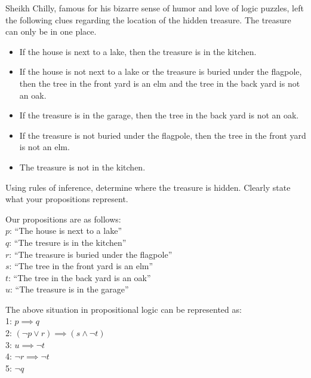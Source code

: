 \documentclass[addpoints]{exam}
\newenvironment{problem}[2][Problem]{\begin{trivlist}
    \item[\hskip \labelsep {\bfseries #1}\hskip \labelsep {\bfseries #2.}]}{\end{trivlist}}
\begin{document}
\begin{sloppypar}
\begin{problem}{6}
Sheikh Chilly, famous for his bizarre sense of humor and love of logic puzzles, left the following clues
regarding the location of the hidden treasure. The treasure can only be in one place.
\begin{itemize}
    \item If the house is next to a lake, then the treasure is in the kitchen.
    \item If the house is not next to a lake or the treasure is buried under the flagpole, then the tree in the front yard is an elm and the tree in the back yard is not an oak.
    \item If the treasure is in the garage, then the tree in the back yard is not an oak.
    \item If the treasure is not buried under the flagpole, then the tree in the front yard is not an elm.
    \item The treasure is not in the kitchen.
\end{itemize}
Using rules of inference, determine where the treasure is hidden. Clearly state what your propositions
represent.
\end{problem}

\begin{questions}
    \question
    \begin{solution}
        Our propositions are as follows: \\ 
        $p$: ``The house is next to a lake'' \\ 
        $q$: ``The tresure is in the kitchen'' \\ 
        $r$: ``The treasure is buried under the flagpole'' \\ 
        $s$: ``The tree in the front yard is an elm'' \\ 
        $t$: ``The tree in the back yard is an oak'' \\ 
        $u$: ``The treasure is in the garage'' 

        The above situation in propositional logic can be represented as: \\ 
        1: $ p \implies q $ \\ 
        2: $ (\neg p \lor r) \implies (s \land \neg t) $ \\ 
        3: $ u \implies \neg t $ \\ 
        4: $ \neg r \implies \neg t $ \\ 
        5: $ \neg q $
        
    \end{solution}
\end{questions}


\end{sloppypar}
\end{document}
